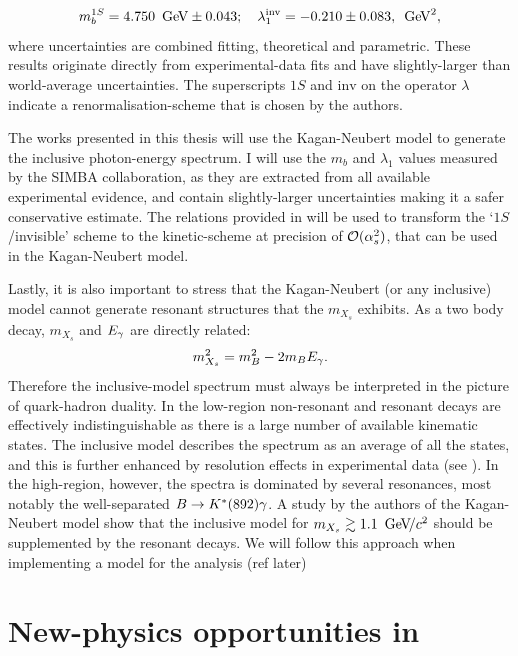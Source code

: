 \begin{equation}\label{eq:simba_result}
    m_b^{1S} =4.750~\mathrm{\,Ge\kern -0.1em V} \pm 0.043;  \quad \lambda^{\mathrm{inv}}_1 = -0.210\pm0.083,~\mathrm{\,Ge\kern -0.1em V}^2, 
\end{equation}
where uncertainties are combined fitting, theoretical and parametric.
These results originate directly from experimental-data fits and have slightly-larger than world-average uncertainties.
The superscripts $1S$ and $\mathrm{inv}$ on the operator $\lambda$ indicate a renormalisation-scheme that is chosen by the authors.

The works presented in this thesis will use the Kagan-Neubert model to generate the inclusive photon-energy spectrum.
I will use the $m_b$ and $\lambda_1$ values measured by the SIMBA collaboration, as they are extracted from all available experimental evidence, and contain slightly-larger uncertainties making it a safer conservative estimate.
The relations provided in \cite{Ligeti:2008ac} will be used to transform the `$1S$/invisible' scheme to the kinetic-scheme at precision of ${\cal O}(\alpha_s^2)$, that can be used in the Kagan-Neubert model.

Lastly, it is also important to stress that the Kagan-Neubert (or any inclusive) model cannot generate resonant structures that the $m_{X_s}$ exhibits.
As a two body decay, $m_{X_s}$ and ${E_{\gamma}}$ are directly related:
\begin{equation}
    m_{X_s}^2 = m_B^2 - 2m_B{E_{\gamma}}.
\end{equation}
Therefore the inclusive-model spectrum must always be interpreted in the picture of quark-hadron duality.
In the low-\Egamma region non-resonant and resonant decays are effectively indistinguishable as there is a large number of available kinematic states.
The inclusive model describes the spectrum as an average of all the states, and this is further enhanced by resolution effects in experimental data (see ).
In the high-\Egamma region, however, the spectra is dominated by several resonances, most notably the well-separated $B\rightarrow K^*(892)\gamma$.
A study by the authors of the Kagan-Neubert model \cite{Kagan:1998ym} show that the inclusive model for $m_{X_s}\gtrsim 1.1~{\mathrm{\,Ge\kern -0.1em V\!/}c^2}$ should be supplemented by the resonant decays.
We will follow this approach when implementing a model for the analysis (ref later)

\section{New-physics opportunities in \texorpdfstring{\BtoXsdgamma}{B->Xsg}}

